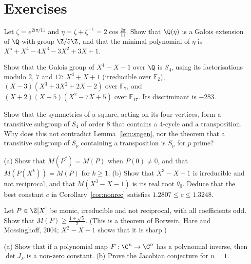 \section{Exercises}

\begin{exercise}[$\star\star$]\label{ex:period}
Let $\zeta=e^{2i\pi/11}$ and $\eta=\zeta+\zeta^{-1}=2\cos\frac{2\pi}{11}$. Show that $\Q(\eta)$ is a Galois extension of $\Q$ with group $\Z/5\Z$, and that
the minimal polynomial of $\eta$ is $X^5+X^4-4X^3-3X^2+3X+1$.
\end{exercise}

\begin{exercise}[$\star\star$]\label{ex:x4}
Show that the Galois group of $X^4-X-1$ over $\Q$ is $S_4$, using its factorisations modulo $2$, $7$ and $17$:
$X^4+X+1$ (irreducible over $\mathbb F_2$), $(X-3)(X^3+3X^2+2X-2)$ over $\mathbb F_7$, and $(X+2)(X+5)(X^2-7X+5)$ over $\mathbb F_{17}$. Its discriminant
is $-283$.
\end{exercise}

\begin{exercise}[$\star\star$]\label{ex:dihedral}
Show that the symmetries of a square, acting on its four vertices, form a transitive subgroup of $S_4$ of order $8$ that contains a $4$-cycle and a
transposition. Why does this not contradict Lemma~\ref{lem:sngen}, nor the theorem that a transitive subgroup of $S_p$ containing a transposition is $S_p$
for $p$ prime?
\end{exercise}

\begin{exercise}[$\star$]\label{ex:mahlerbasic}
(a) Show that $M(P^*)=M(P)$ when $P(0)\ne0$, and that $M(P(X^k))=M(P)$ for $k\ge1$. (b) Show that $X^3-X-1$ is irreducible and not reciprocal, and that
$M(X^3-X-1)$ is its real root $\theta_0$. Deduce that the best constant $c$ in Corollary~\ref{cor:nonrec} satisfies $1.2807\le c\le1.3248$.
\end{exercise}

\begin{exercise}[$\star\star\star$]\label{ex:oddcoef}
Let $P\in\Z[X]$ be monic, irreducible and not reciprocal, with all coefficients odd. Show that $M(P)\ge\frac{1+\sqrt5}2$. (This is a theorem of Borwein,
Hare and Mossinghoff, 2004; $X^2-X-1$ shows that it is sharp.)
\end{exercise}

\begin{exercise}[$\star$]\label{ex:jacdim1}
(a) Show that if a polynomial map $F:\C^n\to\C^n$ has a polynomial inverse, then $\det J_F$ is a non-zero constant. (b) Prove the Jacobian conjecture
for $n=1$.
\end{exercise}

